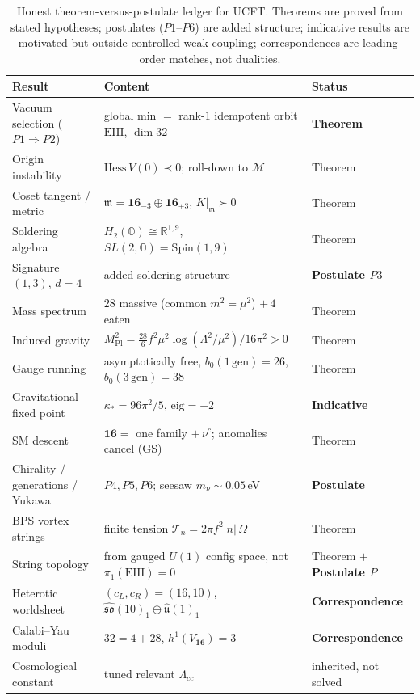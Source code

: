 \documentclass[11pt]{article}
\renewcommand{\arraystretch}{1.18}
\theoremstyle{plain}
\theoremstyle{definition}
\theoremstyle{remark}
\begin{document}
\begin{table}[h]
\centering
\renewcommand{\arraystretch}{1.25}
\begin{tabular}{lll}
\hline
\textbf{Result} & \textbf{Content} & \textbf{Status}\\
\hline
Vacuum selection ($P1\Rightarrow P2$)
  & global min $=$ rank-$1$ idempotent orbit $\mathrm{EIII}$, $\dim 32$
  & \textbf{Theorem}\\
Origin instability
  & $\mathrm{Hess}\,V(0)\prec0$; roll-down to $\mathcal{M}$
  & Theorem\\
Coset tangent / metric
  & $\mathfrak m=\mathbf{16}_{-3}\oplus\overline{\mathbf{16}}_{+3}$, $K|_{\mathfrak m}\succ0$
  & Theorem\\
Soldering algebra
  & $H_{2}(\mathbb{O})\cong\mathbb{R}^{1,9}$, $SL(2,\mathbb{O})=\mathrm{Spin}(1,9)$
  & Theorem\\
Signature $(1,3)$, $d=4$
  & added soldering structure
  & \textbf{Postulate $P3$}\\
Mass spectrum
  & $28$ massive (common $m^{2}=\mu^{2}$) $+\,4$ eaten
  & Theorem\\
Induced gravity
  & $M_{\mathrm{Pl}}^{2}=\tfrac{28}{6}f^{2}\mu^{2}\log(\Lambda^{2}/\mu^{2})/16\pi^{2}>0$
  & Theorem\\
Gauge running
  & asymptotically free, $b_{0}(1\,\mathrm{gen})=26$, $b_{0}(3\,\mathrm{gen})=38$
  & Theorem\\
Gravitational fixed point
  & $\kappa_{\ast}=96\pi^{2}/5$, $\mathrm{eig}=-2$
  & \textbf{Indicative}\\
SM descent
  & $\mathbf{16}=$ one family $+\,\nu^{c}$; anomalies cancel (GS)
  & Theorem\\
Chirality / generations / Yukawa
  & $P4,P5,P6$; seesaw $m_{\nu}\sim0.05$\,eV
  & \textbf{Postulate}\\
BPS vortex strings
  & finite tension $\mathcal{T}_{n}=2\pi f^{2}|n|\,\Omega$
  & Theorem\\
String topology
  & from gauged $U(1)$ config space, not $\pi_{1}(\mathrm{EIII})=0$
  & Theorem $+$ \textbf{Postulate $P$}\\
Heterotic worldsheet
  & $(c_{L},c_{R})=(16,10)$, $\widehat{\mathfrak{so}}(10)_{1}\oplus\widehat{\mathfrak u}(1)_{1}$
  & \textbf{Correspondence}\\
Calabi--Yau moduli
  & $32=4+28$, $h^{1}(V_{\mathbf{16}})=3$
  & \textbf{Correspondence}\\
Cosmological constant
  & tuned relevant $\Lambda_{cc}$
  & inherited, not solved\\
\hline
\end{tabular}
\caption{Honest theorem-versus-postulate ledger for UCFT. Theorems are
proved from stated hypotheses; postulates ($P1$--$P6$) are added
structure; indicative results are motivated but outside controlled
weak coupling; correspondences are leading-order matches, not
dualities.}
\label{tab:strings:ledger}
\end{table}
\end{document}
